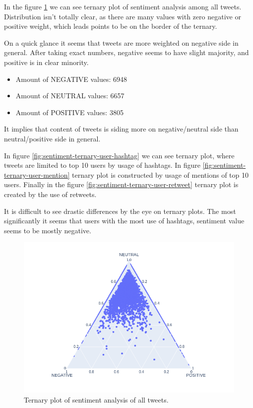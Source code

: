 \documentclass[conference]{IEEEtran}
\begin{document}
    In the figure \ref{fig:sentiment-ternary-all} we can see ternary plot of sentiment analysis among all tweets.
    Distribution isn't totally clear, as there are many values with zero negative or positive weight, which leads points to be on the border of the ternary.

    On a quick glance it seems that tweets are more weighted on negative side in general.
    After taking exact numbers, negative seems to have slight majority, and positive is in clear minority.

    \begin{itemize}
        \item Amount of NEGATIVE values: 6948
        \item Amount of NEUTRAL values: 6657
        \item Amount of POSITIVE values: 3805
    \end{itemize}

    It implies that content of tweets is siding more on negative/neutral side than neutral/positive side in general.

    In figure \ref{fig:sentiment-ternary-user-hashtag} we can see ternary plot, where tweets are limited to top 10 users by usage of hashtags.
    In figure \ref{fig:sentiment-ternary-user-mention} ternary plot is constructed by usage of mentions of top 10 users.
    Finally in the figure \ref{fig:sentiment-ternary-user-retweet} ternary plot is created by the use of retweets.

    It is difficult to see drastic differences by the eye on ternary plots. The most significantly it seems that users with the most use
    of hashtags, sentiment value seems to be mostly negative.

    \begin{figure}
        \includegraphics[scale=0.4]{figures/sentiment_ternary_all}
        \caption{Ternary plot of sentiment analysis of all tweets.}
        \label{fig:sentiment-ternary-all}
    \end{figure}
\end{document}
